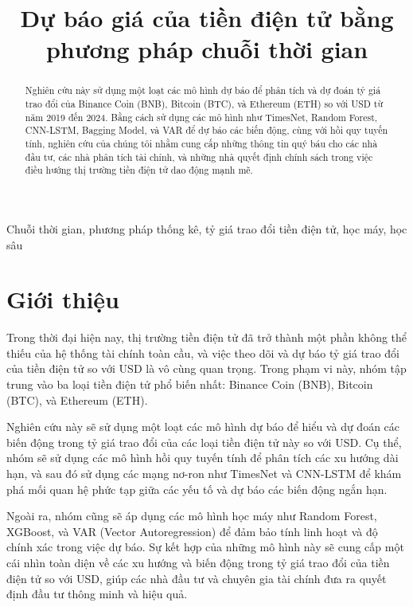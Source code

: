\documentclass[conference]{IEEEtran}
\begin{document}
\title{Dự báo giá của tiền điện tử bằng phương pháp chuỗi thời gian}
\maketitle

\begin{abstract}
Nghiên cứu này sử dụng một loạt các mô hình dự báo để phân tích và dự đoán tỷ giá trao đổi của Binance Coin (BNB), Bitcoin (BTC), và Ethereum (ETH) so với USD từ năm 2019 đến 2024. Bằng cách sử dụng các mô hình như TimesNet, Random Forest, CNN-LSTM, Bagging Model, và VAR để dự báo các biến động, cùng với hồi quy tuyến tính, nghiên cứu của chúng tôi nhằm cung cấp những thông tin quý báu cho các nhà đầu tư, các nhà phân tích tài chính, và những nhà quyết định chính sách trong việc điều hướng thị trường tiền điện tử dao động mạnh mẽ.
\end{abstract}

\begin{IEEEkeywords}
Chuỗi thời gian, phương pháp thống kê, tỷ giá trao đổi tiền điện tử, học máy, học sâu
\end{IEEEkeywords}

\section{Giới thiệu}
Trong thời đại hiện nay, thị trường tiền điện tử đã trở thành một phần không thể thiếu của hệ thống tài chính toàn cầu, và việc theo dõi và dự báo tỷ giá trao đổi của tiền điện tử so với USD là vô cùng quan trọng. Trong phạm vi này, nhóm tập trung vào ba loại tiền điện tử phổ biến nhất: Binance Coin (BNB), Bitcoin (BTC), và Ethereum (ETH).

Nghiên cứu này sẽ sử dụng một loạt các mô hình dự báo để hiểu và dự đoán các biến động trong tỷ giá trao đổi của các loại tiền điện tử này so với USD. Cụ thể, nhóm sẽ sử dụng các mô hình hồi quy tuyến tính để phân tích các xu hướng dài hạn, và sau đó sử dụng các mạng nơ-ron như TimesNet và CNN-LSTM để khám phá mối quan hệ phức tạp giữa các yếu tố và dự báo các biến động ngắn hạn.

Ngoài ra, nhóm cũng sẽ áp dụng các mô hình học máy như Random Forest, XGBoost, và VAR (Vector Autoregression) để đảm bảo tính linh hoạt và độ chính xác trong việc dự báo. Sự kết hợp của những mô hình này sẽ cung cấp một cái nhìn toàn diện về các xu hướng và biến động trong tỷ giá trao đổi của tiền điện tử so với USD, giúp các nhà đầu tư và chuyên gia tài chính đưa ra quyết định đầu tư thông minh và hiệu quả.
\end{document}
